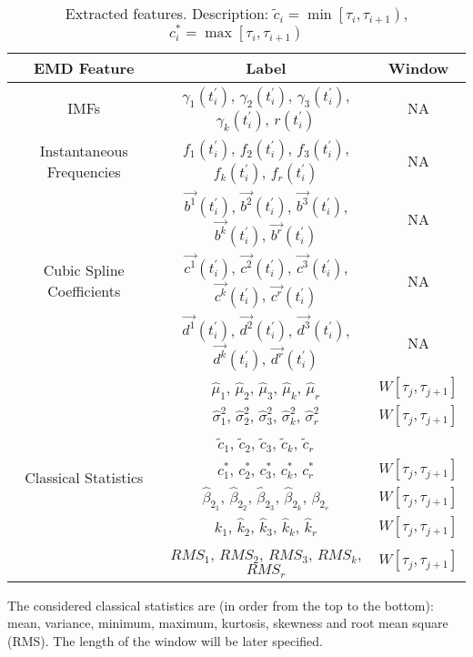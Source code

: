 \begin{table}[H]
\centering
\small
\captionsetup{font=scriptsize}
\begin{tabular}{ccc} 
\toprule
{EMD Feature} & {Label}  & Window \\ 
\midrule
IMFs & $\gamma_1(t_i^{'})$, $\gamma_2(t_i^{'})$, $\gamma_3(t_i^{'})$, $\gamma_k(t_i^{'})$, $r(t_i^{'})$ & NA \\ \hline
Instantaneous Frequencies & $f_1(t_i^{'})$, $f_2(t_i^{'})$, $f_3(t_i^{'})$, $f_k(t_i^{'})$, $f_r(t_i^{'})$ & NA \\ \hline
\multirow{3}{*}{Cubic Spline Coefficients} & $\vec{b^1}(t_i^{'})$, $\vec{b^2}(t_i^{'})$, $\vec{b^3}(t_i^{'})$, $\vec{b^k}(t_i^{'})$, $\vec{b^r}(t_i^{'})$  & NA \\
 & $\vec{c^1}(t_i^{'})$, $\vec{c^2}(t_i^{'})$, $\vec{c^3}(t_i^{'})$, $\vec{c^k}(t_i^{'})$, $\vec{c^r}(t_i^{'})$  & NA \\
  & $\vec{d^1}(t_i^{'})$, $\vec{d^2}(t_i^{'})$, $\vec{d^3}(t_i^{'})$, $\vec{d^k}(t_i^{'})$, $\vec{d^r}(t_i^{'})$  & NA \\ \hline
\multirow{7}{*}{Classical Statistics} & $\hat{\mu}_1$, $\hat{\mu}_2$, $\hat{\mu}_3$, $\hat{\mu}_k$, $\hat{\mu}_r$ & $W \left[ \tau_{j}, \tau_{j+1} \right]$\\
 & $\hat{\sigma}^2_1$, $\hat{\sigma}^2_2$, $\hat{\sigma}^2_3$, $\hat{\sigma}^2_k$, $\hat{\sigma}^2_r$  & $W \left[ \tau_{j}, \tau_{j+1} \right]$\\
 & $\tilde{c}_1$, $\tilde{c}_2$, $\tilde{c}_3$, $\tilde{c}_k$, $\tilde{c}_r$ & \\
 & $c^{*}_1$, $c^{*}_2$, $c^{*}_3$, $c^{*}_k$, $c^{*}_r$ & $W \left[ \tau_{j}, \tau_{j+1} \right]$\\ 
 & $\hat{\beta}_{2_1}$, $\hat{\beta}_{2_2}$, $\hat{\beta}_{2_3}$, $\hat{\beta}_{2_k}$, $\hat{\beta}_{2_r}$ & $W \left[ \tau_{j}, \tau_{j+1} \right]$\\ 
 & $\hat{k}_1$, $\hat{k}_2$, $\hat{k}_3$, $\hat{k}_k$, $\hat{k}_r$ & $W \left[ \tau_{j}, \tau_{j+1} \right]$\\ 
 & $RMS_1$, $RMS_2$, $RMS_3$, $RMS_k$, $RMS_r$  & $W \left[ \tau_{j}, \tau_{j+1} \right]$\\ 
\bottomrule
\end{tabular}
\caption{Extracted features. Description: $\tilde{c}_i = \min \left[ \tau_i, \tau_{i+1} \right)$, $c^{*}_i = \max \left[ \tau_i, \tau_{i+1} \right)$}
\label{feature_tbl}
\end{table}

The considered classical statistics are (in order from the top to the bottom): mean, variance, minimum, maximum, kurtosis, skewness and root mean square (RMS). The length of the window will be later specified.
